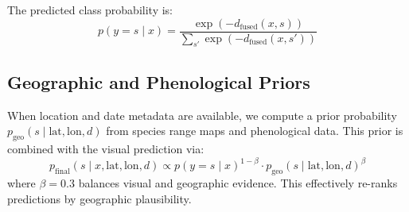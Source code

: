 The predicted class probability is:
\begin{equation}
  p(y = s \mid x) = \frac{\exp(-d_{\text{fused}}(x, s))}
  {\sum_{s'} \exp(-d_{\text{fused}}(x, s'))}
  \label{eq:prediction}
\end{equation}

\subsection{Geographic and Phenological Priors}

When location and date metadata are available, we compute a prior
probability $p_{\text{geo}}(s \mid \text{lat}, \text{lon}, d)$ from
species range maps and phenological data. This prior is combined with
the visual prediction via:
\begin{equation}
  p_{\text{final}}(s \mid x, \text{lat}, \text{lon}, d) \propto
  p(y = s \mid x)^{1-\beta} \cdot
  p_{\text{geo}}(s \mid \text{lat}, \text{lon}, d)^{\beta}
\end{equation}
where $\beta = 0.3$ balances visual and geographic evidence. This
effectively re-ranks predictions by geographic plausibility.


